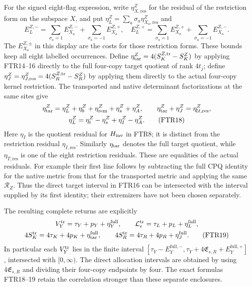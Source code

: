 For the signed eight-flag expression, write
$\eta_{X,\mathrm{res}}^Z$ for the residual of the restriction
form on the subspace $X$, and put
$\eta_L^Z=\sum_a\sigma_a\eta_{X_a,\mathrm{res}}^Z$ and
\[
 E_L^{Z,-}=\sum_{\sigma_a=1}E_{X_a}^{Z,-}
              +\sum_{\sigma_a=-1}E_{X_a}^{Z,+},\quad
 E_L^{Z,+}=\sum_{\sigma_a=1}E_{X_a}^{Z,+}
              +\sum_{\sigma_a=-1}E_{X_a}^{Z,-}.          \tag{FTR17}
\]
The $E_{X_a}^{Z,\pm}$ in this display are the costs for those
restriction forms. These bounds keep all eight labelled occurrences.
Define
$\eta_{\rm tar}^Z=4(S_K^{Z,\rm tr}-S_K^Z)$ by applying FTR14--16
directly to the full four-copy target quotient of rank $4t_j$;
define $\eta_J^Z=\eta_{J,\mathrm{res}}^Z
 =4(S_R^{Z,\rm tr}-S_R^Z)$ by applying them
directly to the actual four-copy kernel restriction. The transported
and native determinant factorizations at the same sites give
\[
\begin{gathered}
 \eta_{\rm tar}^Z=\eta_L^Z+\eta_b^Z+\eta_{\rm rem}^Z+\eta_s^Z+\eta_A^Z,
 \qquad \eta_{\rm tar}^Z+\eta_J^Z=\eta_{\mathcal U,\mathrm{res}}^Z,\\
 \eta_L^Z=\eta_t^Z-\eta_s^Z+\eta_I^Z-\eta_A^Z .         \tag{FTR18}
\end{gathered}
\]
Here $\eta_I$ is the quotient residual for $H_{\rm inv}$ in
FTR8; it is distinct from the restriction residual
$\eta_{I,\mathrm{res}}$. Similarly $\eta_{\rm tar}$ denotes
the full target quotient, while $\eta_{T,\mathrm{res}}$ is
one of the eight restriction residuals. These are equalities
of the actual residuals. For example their
first line follows by subtracting the full CPQ identity for the
native metric from that for the transported metric and applying
the same $\mathcal R_Z$. Thus the direct target interval in
FTR16 can be intersected with the interval supplied by its first
identity; their extremizers have not been chosen separately.

The resulting complete returns are explicitly
\[
\begin{gathered}
 V_Y^{\rm tr}=\tau_Y+p_Y+\eta_Y^{\rm full},\qquad
 \mathcal L_e^{\rm tr}=\tau_L+p_L+\eta_L^{\rm full},\\
 4S_K^{\rm tr}=4\tau_K+4p_K+\eta_{\rm tar}^{\rm full},\qquad
 4S_R^{\rm tr}=4\tau_R+4p_R+\eta_J^{\rm full} .          \tag{FTR19}
\end{gathered}
\]
In particular each $V_Y^{\rm tr}$ lies in the finite interval
$[\tau_Y-E_Y^{\mathrm{full},-},
\tau_Y+4\mathfrak E_{s,R}+E_Y^{\mathrm{full},+}]$,
intersected with $[0,\infty)$. The direct allocation intervals
are obtained by using $4\mathfrak E_{s,R}$ and dividing their
four-copy endpoints by four. The exact formulas FTR18--19 retain
the correlation stronger than these separate enclosures.

